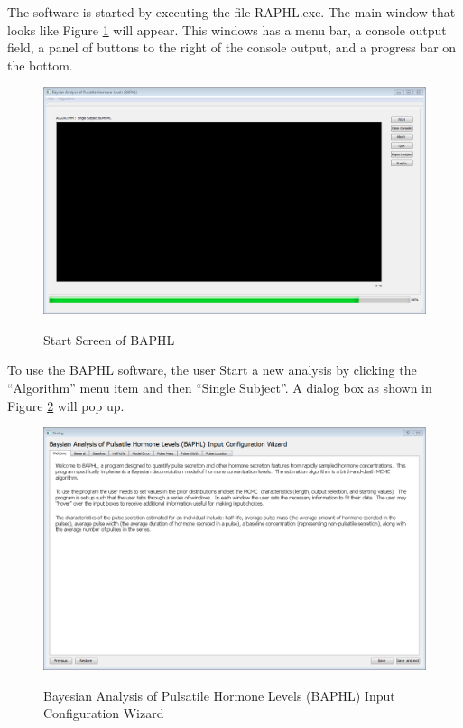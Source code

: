 \documentclass[11pt]{book}
\begin{document}
The software is started by executing the file RAPHL.exe.  The main window that looks like Figure \ref{startscreen} will appear.  This windows has a menu bar, a console output field, a panel of buttons to the right of the console output, and a progress bar on the bottom.
\begin{figure}
  \centering
  \includegraphics[width=\textwidth]{start.PNG}\\
  \caption{Start Screen of BAPHL}\label{startscreen}
\end{figure}
\newpage
To use the BAPHL software, the user
Start a new analysis by clicking the ``Algorithm'' menu item and then ``Single Subject''.  A dialog box as shown in Figure \ref{singlesubject} will pop up.\\
\begin{figure}
  \centering
  \includegraphics[width=\textwidth]{singlesubject.PNG}\\
  \caption{Bayesian Analysis of Pulsatile Hormone Levels (BAPHL) Input Configuration Wizard}\label{singlesubject}
\end{figure}
\end{document}
